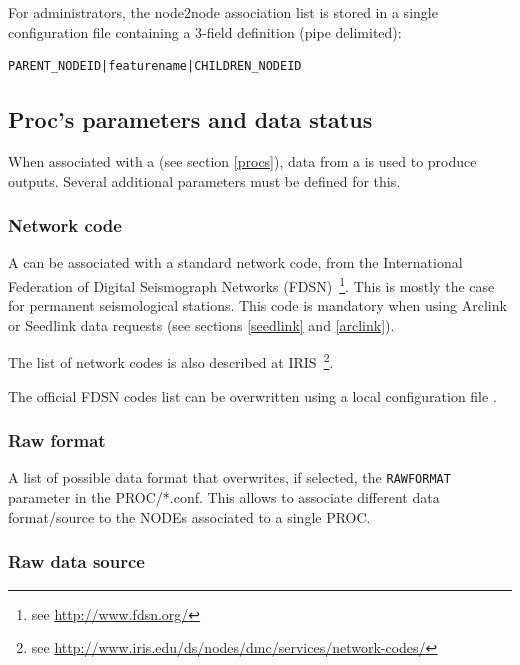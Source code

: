 For administrators, the node2node association list is stored in a single configuration file containing a 3-field definition (pipe delimited):

\begin{lstlisting}[title=\wofile{nodes2nodes.rc} (excerpt)]
PARENT_NODEID|featurename|CHILDREN_NODEID
\end{lstlisting}


\subsection{Proc's parameters and data status}
\label{nodeprocparam}
When associated with a  (see section \ref{procs}), data from a  is used to produce outputs. Several additional parameters must be defined for this.


\subsubsection{Network code}

A  can be associated with a standard network code, from the International Federation of Digital Seismograph Networks (FDSN)~\footnote{see \url{http://www.fdsn.org/}}. This is mostly the case for permanent seismological stations. This code is mandatory when using Arclink or Seedlink data requests (see sections \ref{seedlink} and \ref{arclink}).

The list of network codes is also described at IRIS~\footnote{see \url{http://www.iris.edu/ds/nodes/dmc/services/network-codes/}}.

The official FDSN codes list can be overwritten using a local configuration file .

\subsubsection{Raw format}

A list of possible data format that overwrites, if selected, the \texttt{RAWFORMAT} parameter in the PROC/*.conf. This allows to associate different data format/source to the NODEs associated to a single PROC.


\subsubsection{Raw data source}

